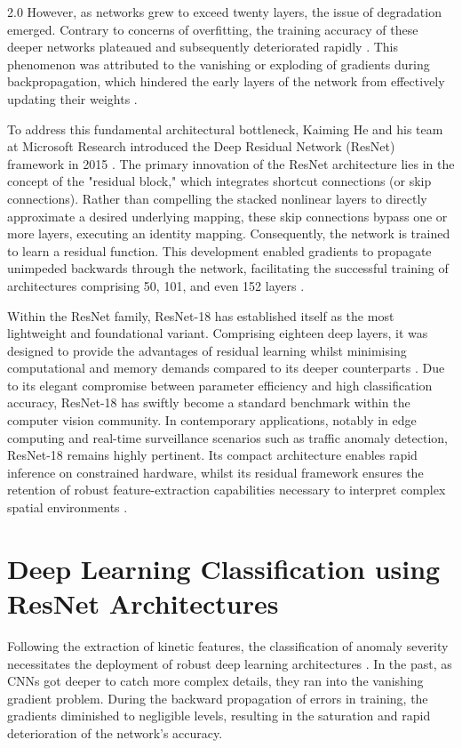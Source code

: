 \begin{spacing}{2.0}
However, as networks grew to exceed twenty layers, the issue of degradation emerged. Contrary to concerns of overfitting, the training accuracy of these deeper networks plateaued and subsequently deteriorated rapidly \cite{he_deep_2016}. This phenomenon was attributed to the vanishing or exploding of gradients during backpropagation, which hindered the early layers of the network from effectively updating their weights \cite{krizhevsky_imagenet_2017}.

To address this fundamental architectural bottleneck, Kaiming He and his team at Microsoft Research introduced the Deep Residual Network (ResNet) framework in 2015 \cite{he_deep_2016}. The primary innovation of the ResNet architecture lies in the concept of the "residual block," which integrates shortcut connections (or skip connections). Rather than compelling the stacked nonlinear layers to directly approximate a desired underlying mapping, these skip connections bypass one or more layers, executing an identity mapping. Consequently, the network is trained to learn a residual function. This development enabled gradients to propagate unimpeded backwards through the network, facilitating the successful training of architectures comprising 50, 101, and even 152 layers \cite{he_deep_2016}.

Within the ResNet family, ResNet-18 has established itself as the most lightweight and foundational variant. Comprising eighteen deep layers, it was designed to provide the advantages of residual learning whilst minimising computational and memory demands compared to its deeper counterparts \cite{targ_resnet_2016}. Due to its elegant compromise between parameter efficiency and high classification accuracy, ResNet-18 has swiftly become a standard benchmark within the computer vision community. In contemporary applications, notably in edge computing and real-time surveillance scenarios such as traffic anomaly detection, ResNet-18 remains highly pertinent. Its compact architecture enables rapid inference on constrained hardware, whilst its residual framework ensures the retention of robust feature-extraction capabilities necessary to interpret complex spatial environments \cite{han_deep_2015}.

\section{Deep Learning Classification using ResNet Architectures}
Following the extraction of kinetic features, the classification of anomaly severity necessitates the deployment of robust deep learning architectures \cite{robles-serrano_automatic_2021, aboah_vision-based_2021, basheer_ahmed_real-time_2023}. In the past, as CNNs got deeper to catch more complex details, they ran into the vanishing gradient problem. During the backward propagation of errors in training, the gradients diminished to negligible levels, resulting in the saturation and rapid deterioration of the network’s accuracy.


\end{spacing}
